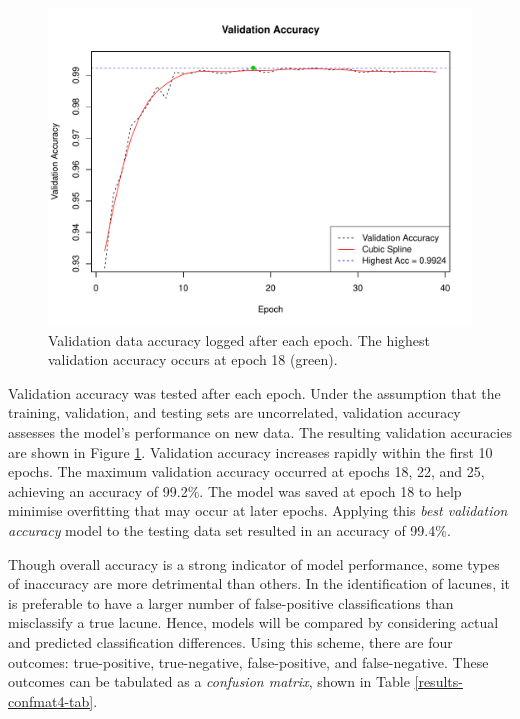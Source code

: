 \begin{figure}[b]
	\centering
	\includegraphics[width=\textwidth]{Images/7_valid_acc4.pdf}
	\caption{\small{Validation data accuracy logged after each epoch. The highest validation accuracy occurs at epoch 18 (green).}}
	\label{results-valid-acc4-fig}
\end{figure}

Validation accuracy was tested after each epoch. Under the assumption that the training, validation, and testing sets are uncorrelated, validation accuracy assesses the model's performance on new data. The resulting validation accuracies are shown in Figure \ref{results-valid-acc4-fig}. Validation accuracy increases rapidly within the first 10 epochs. The maximum validation accuracy occurred at epochs 18, 22, and 25, achieving an accuracy of 99.2\%. The model was saved at epoch 18 to help minimise overfitting that may occur at later epochs. Applying this \emph{best validation accuracy} model to the testing data set resulted in an accuracy of 99.4\%.

Though overall accuracy is a strong indicator of model performance, some types of inaccuracy are more detrimental than others. In the identification of lacunes, it is preferable to have a larger number of false-positive classifications than misclassify a true lacune. Hence, models will be compared by considering actual and predicted classification differences. Using this scheme, there are four outcomes: true-positive, true-negative, false-positive, and false-negative. These outcomes can be tabulated as a \textit{confusion matrix}, shown in Table \ref{results-confmat4-tab}.


